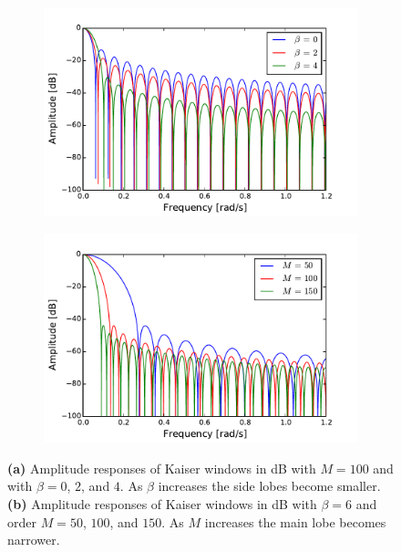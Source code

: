 \begin{figure}[H]
\centering
\begin{subfigure}{0.49\textwidth}
\centering
\includegraphics[width=\textwidth]{figures/dbplots/kaiser_beta.pdf}
\caption{}
\label{fig:kaiser_beta}
\end{subfigure}
\begin{subfigure}{0.49\textwidth}
\centering
\includegraphics[width=\textwidth]{figures/dbplots/kaiser_order.pdf}
\caption{}
\label{fig:kaiser_order}
\end{subfigure}
\caption{\textbf{(a)} Amplitude responses of Kaiser windows in dB with $M=100$ and with $\beta=0$, $2$, and $4$. As $\beta$ increases the side lobes become smaller. \textbf{(b)} Amplitude responses of Kaiser windows in dB with $\beta=6$ and order $M=50$, $100$, and $150$. As $M$ increases the main lobe becomes narrower.}
\end{figure}
 

